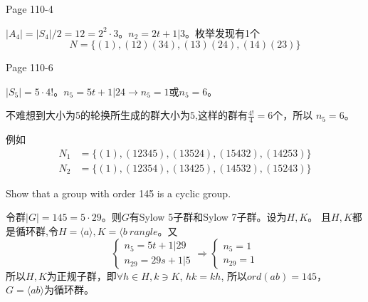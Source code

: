 \documentclass{ximera}
\begin{document}
\begin{problem} Page 110-4
    \begin{solution}
        $|A_4|=|S_4|/2=12=2^2\cdot 3$。$n_2 = 2t+1 | 3$。枚举发现有1个
        $$
            N=\{(1),(12)(34),(13)(24),(14)(23)\}
        $$
    \end{solution}
\end{problem}

\begin{problem} Page 110-6
    \begin{solution}
        $|S_5|=5 \cdot 4!$。$n_5 = 5t+1 | 24 \rightarrow n_5 = 1$或$n_5=6$。

        不难想到大小为5的轮换所生成的群大小为$5$,这样的群有$\frac {4!} 4 = 6$个，所以
        $n_5 = 6$。

        例如
        $$
        \begin{aligned}
            N_1&=\{(1),(12345),(13524),(15432),(14253)\}\\
            N_2&=\{(1),(12354),(13425),(14532),(15243)\}
        \end{aligned}
        $$
    \end{solution}
\end{problem}

\begin{problem} Show that a group with order 145 is a cyclic group.
    \begin{solution}
        令群$|G|=145=5 \cdot 29$。则$G$有Sylow 5子群和Sylow 7子群。设为$H,K$。
        且$H,K$都是循环群,令$H=\langle a \rangle, K = \langle b \ rangle$。又
        $$
        \left \{
        \begin{aligned}
            n_5 = 5t + 1 | 29 \\
            n_{29} = 29s + 1 | 5
        \end{aligned}
        \right.
        \Longrightarrow
        \left \{
        \begin{aligned}
            n_5 = 1 \\
            n_{29} = 1
        \end{aligned}
        \right.
        $$
        所以$H,K$为正规子群，即$\forall h \in H, k \ni K$, $hk=kh$, 所以$ord(ab)=145$，$G=\langle ab \rangle$为循环群。
    \end{solution}
\end{problem}
\end{document}
